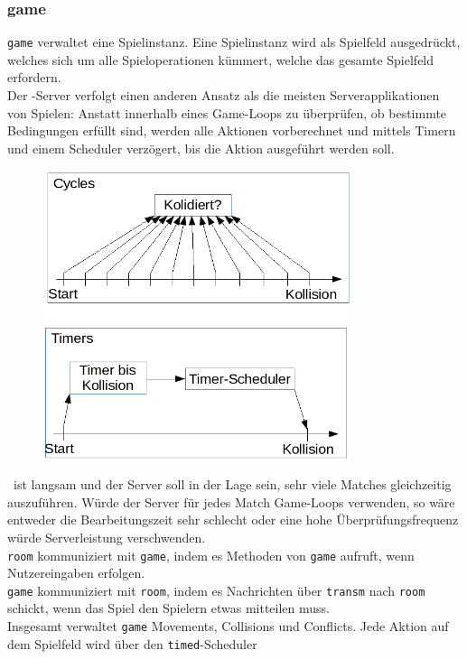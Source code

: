 \subsubsection{game}
\verb+game+ verwaltet eine Spielinstanz. Eine Spielinstanz wird als Spielfeld ausgedrückt, welches sich um alle Spieloperationen kümmert, welche das gesamte Spielfeld erfordern. \\
Der \vires-Server verfolgt einen anderen Ansatz als die meisten Serverapplikationen von Spielen: 
Anstatt innerhalb eines Game-Loops zu überprüfen, ob bestimmte Bedingungen erfüllt sind,
werden alle Aktionen vorberechnet und mittels Timern und einem Scheduler verzögert, bis die Aktion ausgeführt werden soll. \\
\begin{figure}[H]
	\centering
	\includegraphics[width=0.8\textwidth]{Timers.png}
\end{figure}
\vires\ ist langsam und der Server soll in der Lage sein, sehr viele Matches gleichzeitig auszuführen. 
Würde der Server für jedes Match Game-Loops verwenden, so wäre entweder die Bearbeitungszeit sehr schlecht oder eine hohe
Überprüfungsfrequenz würde Serverleistung verschwenden. \\
\verb+room+ kommuniziert mit \verb+game+, indem es Methoden von \verb+game+ aufruft, wenn Nutzereingaben erfolgen. \\
\verb+game+ kommuniziert mit \verb+room+, indem es Nachrichten über \verb+transm+ nach \verb+room+ schickt, wenn das Spiel den Spielern etwas mitteilen muss. \\
Insgesamt verwaltet \verb+game+ Movements, Collisions und Conflicts. Jede Aktion auf dem Spielfeld wird über den \verb+timed+-Scheduler
